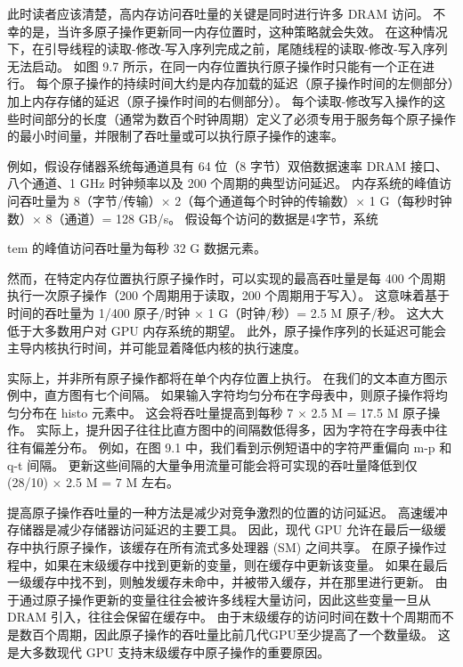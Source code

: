 此时读者应该清楚，高内存访问吞吐量的关键是同时进行许多 DRAM 访问。 不幸的是，当许多原子操作更新同一内存位置时，这种策略就会失效。 在这种情况下，在引导线程的读取-修改-写入序列完成之前，尾随线程的读取-修改-写入序列无法启动。 如图 9.7 所示，在同一内存位置执行原子操作时只能有一个正在进行。 每个原子操作的持续时间大约是内存加载的延迟（原子操作时间的左侧部分）加上内存存储的延迟（原子操作时间的右侧部分）。 每个读取-修改写入操作的这些时间部分的长度（通常为数百个时钟周期）定义了必须专用于服务每个原子操作的最小时间量，并限制了吞吐量或可以执行原子操作的速率。

例如，假设存储器系统每通道具有 64 位（8 字节）双倍数据速率 DRAM 接口、八个通道、1 GHz 时钟频率以及 200 个周期的典型访问延迟。 内存系统的峰值访问吞吐量为 8（字节/传输）× 2（每个通道每个时钟的传输数）× 1 G（每秒时钟数）× 8（通道）= 128 GB/s。 假设每个访问的数据是4字节，系统

tem 的峰值访问吞吐量为每秒 32 G 数据元素。

然而，在特定内存位置执行原子操作时，可以实现的最高吞吐量是每 400 个周期执行一次原子操作（200 个周期用于读取，200 个周期用于写入）。 这意味着基于时间的吞吐量为 1/400 原子/时钟 × 1 G（时钟/秒）= 2.5 M 原子/秒。 这大大低于大多数用户对 GPU 内存系统的期望。 此外，原子操作序列的长延迟可能会主导内核执行时间，并可能显着降低内核的执行速度。

实际上，并非所有原子操作都将在单个内存位置上执行。 在我们的文本直方图示例中，直方图有七个间隔。 如果输入字符均匀分布在字母表中，则原子操作将均匀分布在 histo 元素中。 这会将吞吐量提高到每秒 7 × 2.5 M = 17.5 M 原子操作。 实际上，提升因子往往比直方图中的间隔数低得多，因为字符在字母表中往往有偏差分布。 例如，在图 9.1 中，我们看到示例短语中的字符严重偏向 m-p 和 q-t 间隔。 更新这些间隔的大量争用流量可能会将可实现的吞吐量降低到仅 (28/10) × 2.5 M = 7 M 左右。

提高原子操作吞吐量的一种方法是减少对竞争激烈的位置的访问延迟。 高速缓冲存储器是减少存储器访问延迟的主要工具。 因此，现代 GPU 允许在最后一级缓存中执行原子操作，该缓存在所有流式多处理器 (SM) 之间共享。 在原子操作过程中，如果在末级缓存中找到更新的变量，则在缓存中更新该变量。 如果在最后一级缓存中找不到，则触发缓存未命中，并被带入缓存，并在那里进行更新。 由于通过原子操作更新的变量往往会被许多线程大量访问，因此这些变量一旦从 DRAM 引入，往往会保留在缓存中。 由于末级缓存的访问时间在数十个周期而不是数百个周期，因此原子操作的吞吐量比前几代GPU至少提高了一个数量级。 这是大多数现代 GPU 支持末级缓存中原子操作的重要原因。

